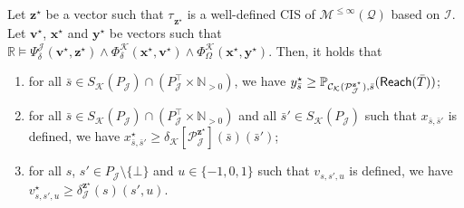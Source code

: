 \documentclass[a4paper,UKenglish,cleveref,autoref,thm-restate,colorlinks]{lipics-v2021}
\newcommand{\IR}{\mathbb{R}}
\newcommand{\IN}{\mathbb{N}}
\newcommand{\INpos}{\IN_{>0}}
\newcommand{\mdp}{\mathcal{M}}
\newcommand{\mdpStateSpace}{S}
\newcommand{\weightVal}{u}
\newcommand{\ocmdp}{\mathcal{Q}}
\newcommand{\ocmdpFin}[2]{\mdp^{\leq #2}(#1)}
\newcommand{\ocConfig}{s}
\newcommand{\ocTrans}{\delta}
\newcommand{\mchain}{\mathcal{C}}
\newcommand{\ocChain}{\mathcal{P}}
\newcommand{\intPart}{\mathcal{I}}
\newcommand{\intPartB}{\mathcal{J}}
\newcommand{\intPartC}{\mathcal{K}}
\newcommand{\cisChainStrat}[1]{\ocChain^{#1}_{\intPartB}}
\newcommand{\cisChainStateSpace}{P_{\intPartB}}
\newcommand{\cisChainStateSpaceStar}{P_{\intPartB}^{\top}}
\newcommand{\cisChainTransTemplate}[2]{\ocTrans_{#1}^{#2}}
\newcommand{\compressCisStateSpace}{\mdpStateSpace_{\intPartC}({\cisChainStateSpace})}
\newcommand{\cisConfig}{\bar{\ocConfig}}
\newcommand{\cisConfigB}{\bar{\ocConfig}'}
\newcommand{\varTrans}{x}
\newcommand{\solTrans}{\varTrans^\star}
\newcommand{\solTransTuple}{\mathbf{\varTrans}^{\star}}
\newcommand{\varObj}{y}
\newcommand{\solObj}{\varObj^{\star}}
\newcommand{\solObjTuple}{\mathbf{\varObj}^{\star}}
\newcommand{\varStrat}{z}
\newcommand{\solStratTuple}{\mathbf{\varStrat}^{\star}}
\newcommand{\varCis}{v}
\newcommand{\solCis}{\varCis^\star}
\newcommand{\solCisTuple}{\mathbf{\varCis}^\star}
\newcommand{\cisChainSymbSol}{\cisChainStrat{\solStratTuple}}
\newcommand{\compressCisSymbSol}{\mchain_{\intPartC}({\cisChainSymbSol})}
\newcommand{\cisChainTransSymbSol}{\cisChainTransTemplate{\intPartB}{\solStratTuple}}
\newcommand{\compressCisTransSymbSol}{\ocTrans_{\intPartC}[{\cisChainSymbSol}]}
\newcommand{\formulaTransBase}{\Phi_{\ocTrans}}
\newcommand{\formulaObjBase}{\Phi_{\objective}}
\newcommand{\formulaCisBase}{\Psi_{\ocTrans}}
\newcommand{\formulaCis}{\formulaCisBase^\intPartB}
\newcommand{\formulaCisTrans}{\formulaTransBase^\intPartC}
\newcommand{\formulaCisObj}{\formulaObjBase^\intPartC}
\newcommand{\objective}{\Omega}
\newcommand{\reach}[1]{\mathsf{Reach}(#1)}
\newcommand{\target}{T}
\newcommand{\stratBGeneric}[1]{{\tau_{#1}}}
\newcommand{\stratB}{\stratBGeneric{}}
\begin{document}
\begin{lemma}\label{lemma:verification:cis:least assignment}
  Let $\solStratTuple$ be a vector such that $\stratB_{\solStratTuple}$ is a well-defined CIS of $\ocmdpFin{\ocmdp}{\infty}$ based on $\intPart$.
  Let $\solCisTuple$, $\solTransTuple$ and $\solObjTuple$ be vectors such that $\IR\models\formulaCis(\solCisTuple, \solStratTuple)\land\formulaCisTrans(\solTransTuple, \solCisTuple)\land\formulaCisObj(\solTransTuple,\solObjTuple)$.
  Then, it holds that
  \begin{enumerate}
  \item for all $\cisConfig\in\compressCisStateSpace\cap(\cisChainStateSpaceStar\times\INpos)$, we have $\solObj_{\cisConfig}\geq\probaMCverb{\compressCisSymbSol}{\cisConfig}(\reach{\bar{\target}})$;\label{item:verification:cis:la:1}
  \item for all $\cisConfig\in\compressCisStateSpace\cap(\cisChainStateSpaceStar\times\INpos)$ and all $\cisConfigB\in\compressCisStateSpace$ such that $\varTrans_{\cisConfig, \cisConfigB}$ is defined, we have $\solTrans_{\cisConfig, \cisConfigB}\geq\compressCisTransSymbSol(\cisConfig)(\cisConfigB)$;\label{item:verification:cis:la:2}
  \item for all $\ocConfig$, $\ocConfig'\in\cisChainStateSpace\setminus\{\bot\}$ and $\weightVal\in\{-1, 0, 1\}$ such that $\varCis_{\ocConfig, \ocConfig',\weightVal}$ is defined, we have $\solCis_{\ocConfig, \ocConfig',\weightVal}\geq \cisChainTransSymbSol(\ocConfig)(\ocConfig', \weightVal)$.\label{item:verification:cis:la:3}
  \end{enumerate}
\end{lemma}
\end{document}

